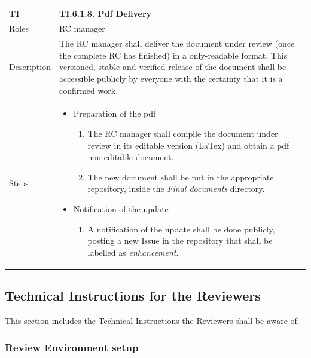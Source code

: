 \documentclass{template/openetcs_article}
\begin{document}
\begin{flushleft}
\tablefirsthead{}
\tablehead{}
\tabletail{}
\tablelasttail{}
\begin{supertabular}{|m{2cm}|m{13cm}|}
\hline
{}
TI & 
TI.6.1.8. Pdf Delivery
\\\hline
Roles &
RC manager
\\\hline
Description &
The RC manager shall deliver the document under review (once the complete RC has finished) in a only-readable format. This versioned, stable and verified release of the document shall be accessible publicly by everyone with the certainty that it is a confirmed work.
\\\hline
Steps &
\begin{itemize}
\item Preparation of the pdf
\begin{enumerate}
\item The RC manager shall compile the document under review in its editable version (LaTex) and obtain a pdf non-editable document.
\item The new document shall be put in the appropriate repository, inside the {\it Final documents} directory.
\end{enumerate}
\item Notification of the update
\begin{enumerate}
\item A notification of the update shall be done publicly, posting a new Issue in the repository that shall be labelled as {\it enhancement}. 
\end{enumerate}
\end{itemize}
\\\hline
\end{supertabular}
\end{flushleft}

\subsection{Technical Instructions for the Reviewers}

This section includes the Technical Instructions the Reviewers shall be aware of.

\subsubsection{Review Environment setup}
\end{document}

